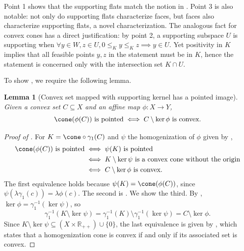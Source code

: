 \documentclass{article}
\theoremstyle{plain}
\newtheorem{lemma}[lemma]{Lemma}
\theoremstyle{definition}
\theoremstyle{remark}
\begin{document}
Point 1 shows that the supporting flats match the notion in \cite[Definition 6.1]{scottBilateralFacialReduction2026}. Point 3 is also notable: not only do supporting flats characterize faces, but faces also characterize supporting flats, a novel characterization. The analogous fact for convex cones has a direct justification: by  point 2, a supporting subspace $U$ is supporting when $\forall y \in W, z \in U, 0 \le_{K} y \le_{K} z  \implies y \in U$. Yet positivity in $K$ implies that all feasible points $y, z$ in the statement must be in $K$, hence the statement is concerned only with the intersection set $K \cap U$. 

To show , we require the
following lemma.
\begin{lemma}[Convex set mapped with supporting kernel has a pointed image]
\label{loc:convex_set_mapped_with_supporting_kernel_has_a_pointed_image.statement}
Given a convex set $C \subseteq X$ and an affine map $\phi:X \to Y$,
\begin{equation*}
\cone (\phi(C)) \text{ is pointed} \iff C \setminus \ker \phi \text{ is convex}.
\end{equation*}
\end{lemma}
\begin{proof}[\hypertarget{loc:convex_set_mapped_with_supporting_kernel_has_a_pointed_image.proof}{}Proof of ]

For $K = \cone \circ \gamma_1(C)$ and $\psi$ the homogenization of $\phi$ given by ,
\begin{align*}
\cone(\phi(C)) \text{ is pointed}
&\iff \psi(K) \text{ is pointed} \\
&\iff K \setminus \ker \psi \text{ is a convex cone without the origin} \\
&\iff C \setminus \ker \phi \text{ is convex}.
\end{align*}
The first equivalence holds because $\psi(K) = \cone(\phi(C))$, since $\psi(\lambda\gamma_1(c)) = \lambda\phi(c)$.
The second is .
We show the third. By , $\ker\phi = \gamma_1^{-1}(\ker\psi)$, so
\begin{equation*}
\gamma_1^{-1}(K \setminus \ker\psi) = \gamma_1^{-1}(K) \setminus \gamma_1^{-1}(\ker\psi) = C \setminus \ker\phi.
\end{equation*}
Since $K \setminus \ker\psi \subseteq (X \times \mathbb{R}_{++})\cup\{0\}$, the last equivalence is given by , which states that a homogenization cone is convex if and only if its associated set is convex.
\end{proof}
\end{document}

